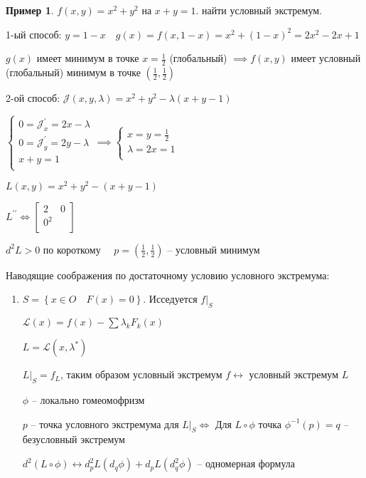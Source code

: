 \documentclass{book}
\newcommand{\pp}[1]{#1^{\prime\prime}}
\theoremstyle{definition}
\newtheorem*{example}{Пример}
\begin{document}
   \begin{example}
       $f(x,y) = x^2+y^2$ на $x + y = 1$. найти условный экстремум.

       1-ый способ:  $y = 1-x\quad g(x) = f(x,1-x) = x^2+(1-x)^2 = 2x^2-2x+1$

       $g(x)$ имеет минимум в точке $x = \frac{1}{2}$ (глобальный) $\implies f(x,y)$ имеет условный (глобальный) минимум в точке $(\frac{1}{2}, \frac{1}{2})$ 

       2-ой способ: $\mathcal J\left( x, y, \lambda \right)  = x^2+y^2-\lambda \left( x+y-1 \right) $

       $\begin{cases}
           0 = \mathcal J_x^{\prime} = 2x - \lambda\\
           0 = \mathcal J_y^{\prime} = 2y-\lambda\\
           x+y = 1\\
       \end{cases} \implies   \begin{cases}
           x = y = \frac{1}{2}\\
           \lambda = 2x = 1\\
       \end{cases}$

       $L(x,y) = x^2+y^2-(x+y-1)$

       $\pp L \iff  \begin{bmatrix} 2&0\\0^2\\ \end{bmatrix} $

       $d^2 L > 0$ по короткому  $\quad p = \left( \frac{1}{2}, \frac{1}{2} \right) $ -- условный минимум
   \end{example}

   Наводящие соображения по достаточному условию условного экстремума:
   \begin{enumerate}
       \item $S = \left\{ x\in O\quad F(x) = 0 \right\} $. Исседуется $f|_S$

           $\mathcal L(x) = f(x) - \sum \lambda_kF_k(x)$

           $L = \mathcal L(x, \lambda^*)$

            $L|_S = f_L$,  таким образом условный экстремум  $f \leftrightarrow $ условный экстремум $L$

             $\phi$ -- локально гомеомофризм

             $p$ -- точка условного экстремума для  $L|_S \iff  $ Для $L\circ \phi$ точка  $\phi^{-1}(p) = q$ -- безусловный экстремум

             $d^2(L\circ \phi) \leftrightarrow d^2_pL(d_q\phi) + d_pL\left( d^2_q \phi \right) $ -- одномерная формула 

   \end{enumerate}
\end{document}
